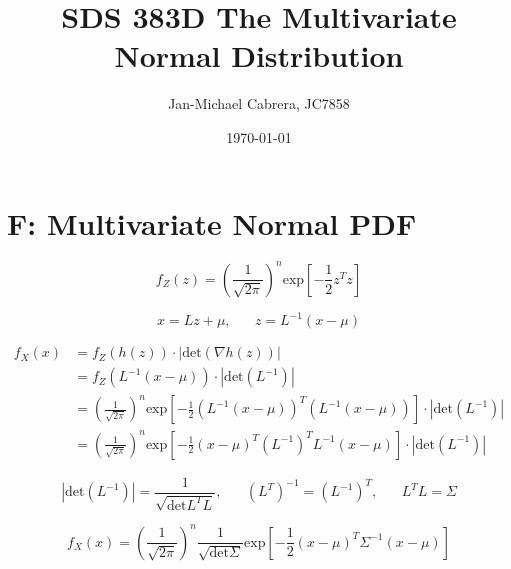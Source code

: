 \documentclass[12pt]{article}
\begin{document}
    \title{SDS 383D The Multivariate Normal Distribution}
    \author{Jan-Michael Cabrera, JC7858}
    \date{\today}
    \maketitle

    \section*{F: Multivariate Normal PDF}

        \begin{equation}
            f_Z(z) = \left ( \frac{1}{\sqrt{2 \pi}}\right)^{n} \text{exp} \left [ -\frac{1}{2} z^T z\right]
        \end{equation}

        \begin{equation}
            x = Lz + \mu, \hspace{20pt} z = L^{-1}(x - \mu)
        \end{equation}

        \begin{align}
            f_X(x) &= f_Z(h(z))\cdot|\text{det}(\nabla h(z))| \\
            &= f_Z(L^{-1}(x-\mu)) \cdot |\text{det}(L^{-1})| \\
            &= \left( \frac{1}{\sqrt{2 \pi}}\right)^n \text{exp}\left[ -\frac{1}{2}(L^{-1}(x-\mu))^T (L^{-1}(x-\mu))\right]\cdot |\text{det}(L^{-1})| \\
            &= \left( \frac{1}{\sqrt{2 \pi}}\right)^n \text{exp}\left[ -\frac{1}{2}(x-\mu)^T (L^{-1})^T L^{-1}(x-\mu)\right]\cdot |\text{det}(L^{-1})|
        \end{align}

        \begin{equation}
            |\text{det}(L^{-1})| = \frac{1}{\sqrt{\text{det}L^T L}}, \hspace{20pt}(L^T)^{-1} = (L^{-1})^T, \hspace{20pt} L^TL = \Sigma
        \end{equation}

        \begin{equation}
            f_X(x) = \left ( \frac{1}{\sqrt{2 \pi}}\right)^{n} \frac{1}{\sqrt{\text{det}\Sigma}} \text{exp} \left [ -\frac{1}{2} (x-\mu)^T \Sigma^{-1} (x-\mu)\right]
        \end{equation}
\end{document}
